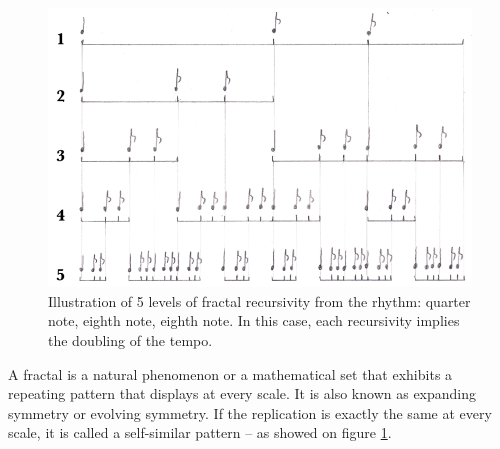 \begin{figure}[h]
\begin{center}
\includegraphics[scale=1.7]{img/1548}
\caption{Illustration of 5 levels of fractal recursivity from the rhythm: quarter note, eighth note, eighth note. In this case, each recursivity implies the doubling of the tempo.}
\label{fractal}
\end{center}
\end{figure}

{A fractal is a natural phenomenon or a mathematical set that exhibits a repeating pattern that displays at every scale. It is also known as expanding symmetry or evolving symmetry. If the replication is exactly the same at every scale, it is called a self-similar pattern -- as showed on figure \ref{fractal}. 

 }

